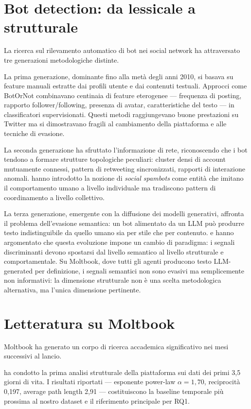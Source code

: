 \documentclass[12pt,a4paper]{report}
\begin{document}
\section{Bot detection: da lessicale a strutturale}

La ricerca sul rilevamento automatico di bot nei social network ha attraversato tre generazioni metodologiche distinte.

La prima generazione, dominante fino alla metà degli anni 2010, si basava su feature manuali estratte dai profili utente e dai contenuti testuali. Approcci come BotOrNot \citep{varol2017} combinavano centinaia di feature eterogenee — frequenza di posting, rapporto follower/following, presenza di avatar, caratteristiche del testo — in classificatori supervisionati. Questi metodi raggiungevano buone prestazioni su Twitter ma si dimostravano fragili al cambiamento della piattaforma e alle tecniche di evasione.

La seconda generazione ha sfruttato l'informazione di rete, riconoscendo che i bot tendono a formare strutture topologiche peculiari: cluster densi di account mutuamente connessi, pattern di retweeting sincronizzati, rapporti di interazione anomali. \citet{cresci2017} hanno introdotto la nozione di \emph{social spambots} come entità che imitano il comportamento umano a livello individuale ma tradiscono pattern di coordinamento a livello collettivo.

La terza generazione, emergente con la diffusione dei modelli generativi, affronta il problema dell'evasione semantica: un bot alimentato da un LLM può produrre testo indistinguibile da quello umano sia per stile che per contenuto. \citet{cresci2020} e \citet{cresci2025} hanno argomentato che questa evoluzione impone un cambio di paradigma: i segnali discriminanti devono spostarsi dal livello semantico al livello strutturale e comportamentale. Su Moltbook, dove tutti gli agenti producono testo LLM-generated per definizione, i segnali semantici non sono evasivi ma semplicemente non informativi: la dimensione strutturale non è una scelta metodologica alternativa, ma l'unica dimensione pertinente.

\section{Letteratura su Moltbook}

Moltbook ha generato un corpo di ricerca accademica significativo nei mesi successivi al lancio.

\citet{holtz2026} ha condotto la prima analisi strutturale della piattaforma sui dati dei primi 3,5 giorni di vita. I risultati riportati — esponente power-law $\alpha = 1{,}70$, reciprocità 0,197, average path length 2,91 — costituiscono la baseline temporale più prossima al nostro dataset e il riferimento principale per RQ1.
\end{document}
